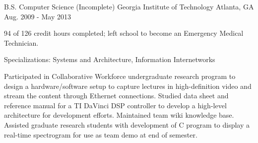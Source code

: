 

\begin{cventries}

  \cventry
    {B.S. Computer Science (Incomplete)} %
    {Georgia Institute of Technology} %
    {Atlanta, GA} %
    {Aug. 2009 - May 2013} %
    {
      \begin{cvitems} %
        \item {94 of 126 credit hours completed; left school to become an Emergency Medical Technician.}
        \item {Specializations: Systems and Architecture,  Information Internetworks}
        \item {Participated in Collaborative Workforce undergraduate research program to design a hardware/software setup to capture lectures in high-definition video and stream the content through Ethernet connections. Studied data sheet and reference manual for a TI DaVinci DSP controller to develop a high-level architecture for development efforts. Maintained team wiki knowledge base. Assisted graduate research students with development of C program to display a real-time spectrogram for use as team demo at end of semester.}
      \end{cvitems}
    }
\end{cventries}
